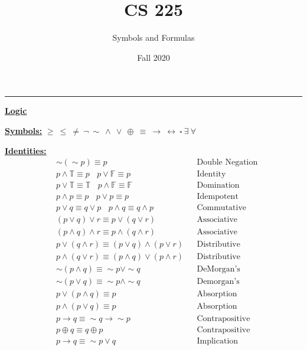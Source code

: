 \documentclass[11pt]{article}
\title{CS 225}
\author{Symbols and Formulas}
\date{Fall 2020}
\begin{document}
\maketitle
\hrule

\begin{center}\underline{\bf \large Logic}\end{center}
\bigskip

\underline{\bf Symbols:} $\geq \ \leq \ \neq \ \neg \ \sim \ \wedge \ \vee \ \oplus \ \equiv \ \rightarrow \ \leftrightarrow \ \square \ \exists \ \forall$
\bigskip

\begin{minipage}[c]{0.4\textwidth}
\underline{\bf Identities:} 
\begin{align*}
    &\sim (\sim p) \equiv p &&\text{Double Negation} \\
    &p \wedge \mathbb{T} \equiv p \ \ \ \ p \vee \mathbb{F} \equiv p &&\text{Identity} \\
    &p \vee \mathbb{T} \equiv \mathbb{T} \ \ \ \ p \wedge \mathbb{F} \equiv \mathbb{F} &&\text{Domination} \\
    &p \wedge p \equiv p \ \ \ \ p \vee p \equiv p &&\text{Idempotent} \\
    &p \vee q \equiv q \vee p \ \ \ \ p \wedge q \equiv q \wedge p &&\text{Commutative} \\
    &(p \vee q) \vee r \equiv p \vee (q \vee r) &&\text{Associative} \\
    &(p \wedge q) \wedge r \equiv p \wedge (q \wedge r) &&\text{Associative} \\
    &p \vee (q \wedge r) \equiv (p \vee q) \wedge (p \vee r) &&\text{Distributive} \\
    &p \wedge (q \vee r) \equiv (p \wedge q) \vee (p \wedge r) &&\text{Distributive} \\
    &\sim (p \wedge q) \equiv \sim p \vee \sim q &&\text{DeMorgan's} \\
    &\sim(p \vee q) \equiv \sim p \wedge \sim q &&\text{Demorgan's} \\
    &p \vee (p \wedge q) \equiv p &&\text{Absorption} \\
    &p \wedge (p \vee q) \equiv p &&\text{Absorption} \\
    &p \rightarrow q \equiv \sim q \rightarrow \sim p &&\text{Contrapositive} \\
    &p \oplus q \equiv q \oplus p &&\text{Contrapositive} \\
    &p \rightarrow q \equiv \sim p \vee q &&\text{Implication} \\

\end{align*}
\end{minipage}
\end{document}
